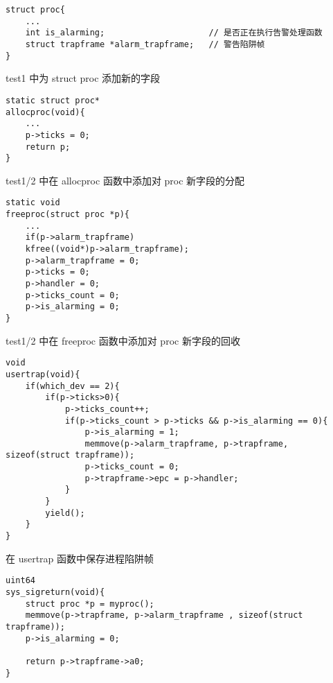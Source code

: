 \begin{listing}[!htb]
	\begin{verbatim}
struct proc{
    ...
    int is_alarming;                     // 是否正在执行告警处理函数
    struct trapframe *alarm_trapframe;   // 警告陷阱帧
}
	\end{verbatim}
	\caption{test1 中为 struct proc 添加新的字段}\label{lst:add_variables_for_proc_test1}
\end{listing}

\begin{listing}[!htb]
	\begin{verbatim}
static struct proc*
allocproc(void){
    ...
    p->ticks = 0;
    return p;
}
	\end{verbatim}
	\caption{test1/2 中在 allocproc 函数中添加对 proc 新字段的分配}\label{lst:add_alloc_in_allocproc_test1}
\end{listing}

\begin{listing}[!htb]
	\begin{verbatim}
static void
freeproc(struct proc *p){
    ...
    if(p->alarm_trapframe)
    kfree((void*)p->alarm_trapframe);
    p->alarm_trapframe = 0;
    p->ticks = 0;
    p->handler = 0;
    p->ticks_count = 0;
    p->is_alarming = 0;
}
	\end{verbatim}
	\caption{test1/2 中在 freeproc 函数中添加对 proc 新字段的回收}\label{lst:add_free_in_freeproc_test1}
\end{listing}

\begin{listing}[!htb]
	\begin{verbatim}
void
usertrap(void){
    if(which_dev == 2){
        if(p->ticks>0){
            p->ticks_count++;
            if(p->ticks_count > p->ticks && p->is_alarming == 0){
                p->is_alarming = 1;
                memmove(p->alarm_trapframe, p->trapframe, sizeof(struct trapframe));
                p->ticks_count = 0;
                p->trapframe->epc = p->handler;
            }
        }
        yield();
    }
}
	\end{verbatim}
	\caption{在 usertrap 函数中保存进程陷阱帧}\label{lst:save_trapframe_in_usertrap}
\end{listing}

\begin{listing}[!htb]
	\begin{verbatim}
uint64
sys_sigreturn(void){
    struct proc *p = myproc();
    memmove(p->trapframe, p->alarm_trapframe , sizeof(struct trapframe));
    p->is_alarming = 0;

    return p->trapframe->a0;
}
	\end{verbatim}
	\caption{}\label{lst:recover_trapframe_in_sys_sigreturn}
\end{listing}

